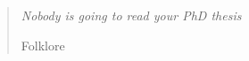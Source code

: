 \documentclass[officiallayout,final]{unihelcompling}
\renewcommand{\:}{\mbox{${\rm :}$}}
\begin{document}


\def\arraystretch{1.2}

\clearpage
%
\frontmatter
\maketitle
\vspace*{\fill}
\thispagestyle{empty} 
\begin{quotation}
\em %
Nobody is going to read your PhD thesis

\medskip
\raggedleft
Folklore
\end{quotation}
\vspace*{\fill}
\onehalfspacing

%

\mainmatter

\tableofcontents



\end{document}
